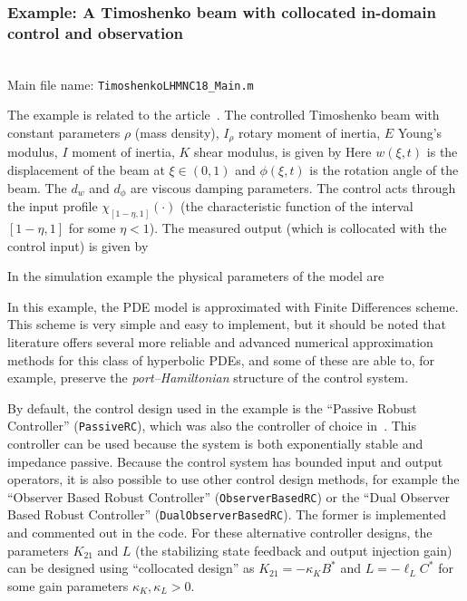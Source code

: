 \documentclass[11pt, a4paper]{amsart}
\theoremstyle{definition}
\numberwithin{equation}{section}
\begin{document}
\medskip

\subsubsection*{Example: A Timoshenko beam with collocated in-domain control and observation}
~\\[-1ex]

\noindent Main file name: \texttt{TimoshenkoLHMNC18\_Main.m}

\medskip

The example is related to the article~\cite{PauLeG22}.
The controlled Timoshenko beam with constant parameters $\rho$ (mass density), $I_\rho$ rotary moment of inertia, $E$  Young's modulus, $I$ moment of inertia, $K$ shear modulus, is given by
Here $w(\xi,t)$ is the displacement of the beam at $\xi\in(0,1)$ and $\phi(\xi,t)$ is the rotation angle of the beam. The $d_w$ and $d_\phi$ are viscous damping parameters. 
The control acts through the input profile $\chi_{[1-\eta,1]}(\cdot)$ (the characteristic function of the interval $[1-\eta,1]$ for some $\eta<1$).
The measured output (which is collocated with the control input) is given by

In the simulation example the physical parameters of the model are 

In this example, the PDE model is approximated with Finite Differences scheme. This scheme is very simple and easy to implement, but it should be noted that literature offers several more reliable and advanced numerical approximation methods for this class of hyperbolic PDEs, and some of these are able to, for example, preserve the \emph{port--Hamiltonian} structure of the control system.

By default, the control design used in the example is the ``Passive Robust Controller'' (\texttt{PassiveRC}), which was also the controller of choice in~\cite{PauLeGLHMNC18}. This controller can be used because the system is both exponentially stable and impedance passive.
Because the control system has bounded input and output operators, it is also possible to use other control design methods, for example the ``Observer Based Robust Controller'' (\texttt{ObserverBasedRC}) or the ``Dual Observer Based Robust Controller'' (\texttt{DualObserverBasedRC}). The former is implemented and commented out in the code. For these alternative controller designs, the parameters $K_{21}$ and $L$ (the stabilizing state feedback and output injection gain) can be designed using ``collocated design'' as $K_{21} = -\kappa_K B^\ast$ and $L=-\ell_L C^\ast$ for some gain parameters $\kappa_K,\kappa_L>0$.
\end{document}
